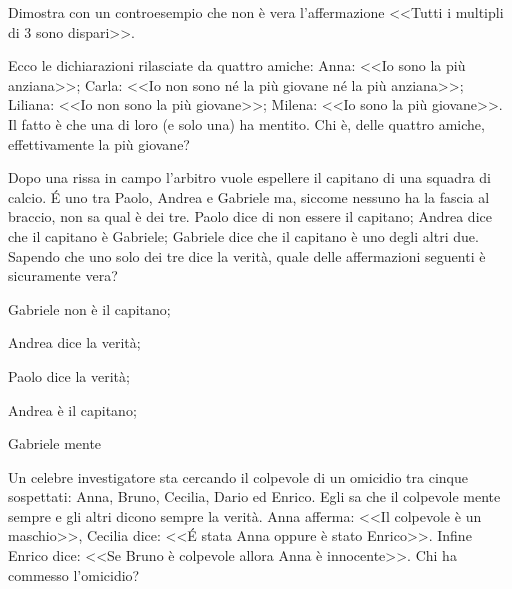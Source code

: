 \begin{esercizio}
\label{ese:\thechapter.16}
 Dimostra con un controesempio che non è vera l'affermazione <<Tutti
i multipli di 3 sono dispari>>.
\end{esercizio}

\begin{esercizio}
\label{ese:\thechapter.17}
Ecco le dichiarazioni rilasciate da quattro amiche: Anna: <<Io sono
la più anziana>>; Carla: <<Io non sono né la più giovane né la più
anziana>>; Liliana: <<Io non sono la più giovane>>; Milena: <<Io sono la
più giovane>>. Il fatto è che una di loro (e solo una) ha mentito. Chi
è, delle quattro amiche, effettivamente la più giovane?
\end{esercizio}

\begin{esercizio}
\label{ese:\thechapter.18}
Dopo una rissa in campo l'arbitro vuole espellere
il capitano di una squadra di calcio. É uno tra
Paolo, Andrea e Gabriele ma, siccome nessuno ha la fascia al braccio,
non sa qual è dei tre. Paolo dice di non essere il capitano; Andrea
dice che il capitano è Gabriele; Gabriele dice che il capitano è uno
degli altri due. Sapendo che uno solo dei tre dice la verità, quale
delle affermazioni seguenti è sicuramente vera?
\begin{multicols}{2}
\begin{enumeratea}
\item Gabriele non è il capitano;
\item Andrea dice la verità;
\item Paolo dice la verità;
\item Andrea è il capitano;
\item Gabriele mente
\end{enumeratea}
\end{multicols}
\end{esercizio}

\begin{esercizio}
\label{ese:\thechapter.19}
Un celebre investigatore sta cercando il colpevole di un omicidio
tra cinque sospettati: Anna, Bruno, Cecilia, Dario ed Enrico. Egli sa
che il colpevole mente sempre e gli altri dicono sempre la verità. Anna
afferma: <<Il colpevole è un maschio>>, Cecilia dice:
<<É stata Anna oppure è stato Enrico>>. Infine Enrico
dice: <<Se Bruno è colpevole allora Anna è innocente>>. Chi ha commesso
l'omicidio?
\end{esercizio}

